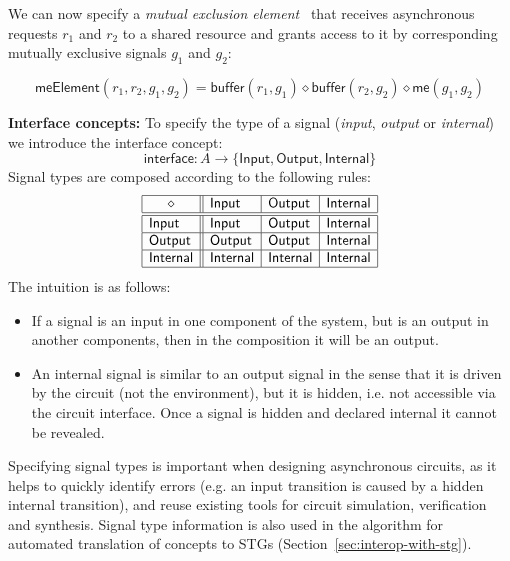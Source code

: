 \documentclass[british, journal]{IEEEtran}
\begin{document}
We can now specify a \emph{mutual exclusion element}~\cite{2008_kinniment_synchronisation}
that receives asynchronous requests $r_{1}$ and $r_{2}$ to a shared
resource and grants access to it by corresponding mutually exclusive
signals $g_{1}$ and $g_{2}$:

\vspace{-3mm}
{\small
\[
\mathsf{meElement}(r_{1}, r_{2}, g_{1}, g_{2})\!=\!\mathsf{buffer}(r_{1}, g_{1}) \diamond \mathsf{buffer}(r_{2}, g_{2}) \diamond \mathsf{me}(g_{1}, g_{2})
\]}
\vspace{-3mm}

\textbf{Interface concepts:} To specify the type of a signal (\emph{input},
\emph{output} or \emph{internal}) we introduce the \textsf{interface} concept:
\[
\mathsf{interface} : A \rightarrow \{\mathsf{Input}, \mathsf{Output}, \mathsf{Internal}\}
\]
Signal types are composed according to the following rules:
\[
\begin{array}{|l||l|l|l|}
\hline
\multicolumn{1}{|c||}{\diamond} & \mathsf{Input}    & \mathsf{Output}   & \mathsf{Internal} \\ \hline \hline
\mathsf{Input}   & \mathsf{Input}    & \mathsf{Output}   & \mathsf{Internal} \\ \hline
\mathsf{Output}  & \mathsf{Output}   & \mathsf{Output}   & \mathsf{Internal} \\ \hline
\mathsf{Internal}& \mathsf{Internal} & \mathsf{Internal} & \mathsf{Internal} \\ \hline
\end{array}
\]
The intuition is as follows:
\begin{itemize}
    \item If a signal is an input in one component of the system, but is an
    output in another components, then in the composition it will be an output.
    \item An internal signal is similar to an output signal in the sense
    that it is driven by the circuit (not the environment), but it is hidden, i.e.
    not accessible via the circuit interface. Once a signal is hidden and declared
    internal it cannot be revealed.
\end{itemize}

\noindent Specifying signal types is important when designing asynchronous
circuits, as it helps to quickly identify errors (e.g. an input transition is
caused by a hidden internal transition), and reuse existing tools for circuit
simulation, verification and synthesis. Signal type information is also used
in the algorithm for automated translation of concepts to
STGs (Section~\ref{sec:interop-with-stg}).
\end{document}
